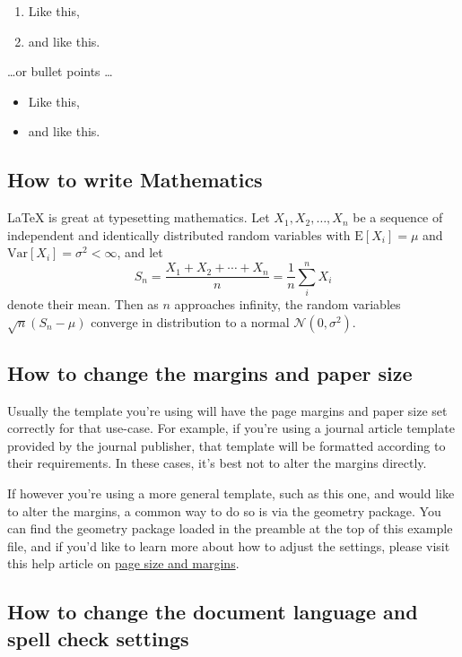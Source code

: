 \documentclass{article}
\begin{document}
\begin{enumerate}
      \item Like this,
      \item and like this.
\end{enumerate}
\dots or bullet points \dots
\begin{itemize}
      \item Like this,
      \item and like this.
\end{itemize}

\subsection{How to write Mathematics}

\LaTeX{} is great at typesetting mathematics. Let $X_1, X_2, \ldots, X_n$ be a sequence of independent and identically distributed random variables with $\text{E}[X_i] = \mu$ and $\text{Var}[X_i] = \sigma^2 < \infty$, and let
\[S_n = \frac{X_1 + X_2 + \cdots + X_n}{n}
      = \frac{1}{n}\sum_{i}^{n} X_i\]
denote their mean. Then as $n$ approaches infinity, the random variables $\sqrt{n}(S_n - \mu)$ converge in distribution to a normal $\mathcal{N}(0, \sigma^2)$.


\subsection{How to change the margins and paper size}

Usually the template you're using will have the page margins and paper size set correctly for that use-case. For example, if you're using a journal article template provided by the journal publisher, that template will be formatted according to their requirements. In these cases, it's best not to alter the margins directly.

If however you're using a more general template, such as this one, and would like to alter the margins, a common way to do so is via the geometry package. You can find the geometry package loaded in the preamble at the top of this example file, and if you'd like to learn more about how to adjust the settings, please visit this help article on \href{https://www.overleaf.com/learn/latex/page_size_and_margins}{page size and margins}.


\subsection{How to change the document language and spell check settings}
\end{document}
